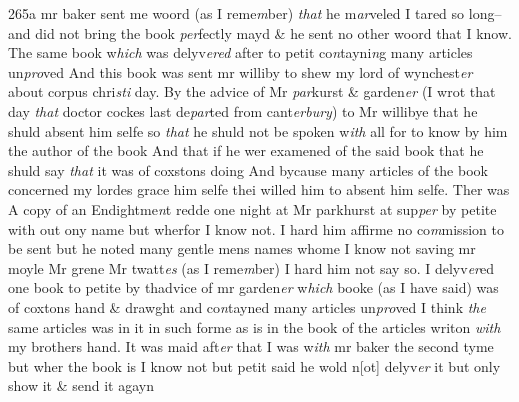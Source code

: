 \documentclass[12pt, a4paper]{book}
\begin{document}
{\color{Mahogany}265a} 
				\marginpar[\vspace{0.5cm}{\textcolor{Gray}{13.}}]{}
			 mr baker sent me woord (as I reme\textit{m}ber) \textit{that }he m\textit{ar}veled I tared so long-- and did not bring the book \textit{per}fectly mayd \& he sent no other woord that I know. 
				\marginpar[\vspace{0.5cm}{\textcolor{Gray}{14.}}]{}
			 The same book w\textit{hich} was delyv\textit{ered} after to petit co\textit{n}tayni\textit{n}g many articles un\textit{pro}ved And this book was sent mr williby to shew my lord of wynchest\textit{er }about corpus chri\textit{sti} day. 
				\marginpar[\vspace{0.5cm}{\textcolor{Gray}{15.}}]{}
			 By the advice of Mr \textit{par}kurst \& garden\textit{er} (I wrot that day \textit{that }doctor cockes last de\textit{par}ted from cant\textit{erbury}) to Mr willibye that he shuld absent him selfe so \textit{that} he shuld not be spoken w\textit{ith} all for to know by him the author of the book And that if he wer examened of the said book that he shuld say \textit{that} it was of coxstons doing And bycause many articles of the book concerned my lordes grace him selfe thei willed him to absent him selfe. 
				\marginpar[\vspace{0.5cm}{\textcolor{Gray}{16.}}]{}
			 Ther was A copy of an Endightme\textit{n}t redde one night at Mr parkhurst at sup\textit{per} by petite with out ony name but wherfor I know not. 
				\marginpar[\vspace{0.5cm}{\textcolor{Gray}{17.18.}}]{}
			 I hard him affirme no co\textit{m}mission to be sent but he noted many gentle mens names whome I know not saving mr moyle Mr grene Mr twatt\textit{es} (as I reme\textit{m}ber) 
				\marginpar[\vspace{0.5cm}{\textcolor{Gray}{19.20.}}]{}
			 I hard him not say so.  
				\marginpar[\vspace{0.5cm}{\textcolor{Gray}{21.}}]{}
			 I delyv\textit{er}ed one book to petite by thadvice of mr garden\textit{er} w\textit{hich} booke (as I have said) was of coxtons hand \& drawght and co\textit{n}tayned many articles un\textit{pro}ved 
				\marginpar[\vspace{0.5cm}{\textcolor{Gray}{22.}}]{}
			 I think \textit{the} same articles was in it in such forme as is in the  book of the articles writon \textit{with} my brothers hand.  
				\marginpar[\vspace{0.5cm}{\textcolor{Gray}{23.}}]{}
			 It was maid aft\textit{er} that I was w\textit{ith} mr baker the second tyme but wher the book is I know not but petit said he wold n[ot] delyv\textit{er} it but only show it \& send it agayn 
\end{document}

